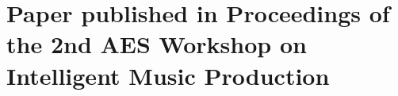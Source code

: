
\chapter{Paper published in Proceedings of the 2nd AES Workshop on Intelligent Music Production}
\label{appendix:jordal_paper}

\cleardoublepage



